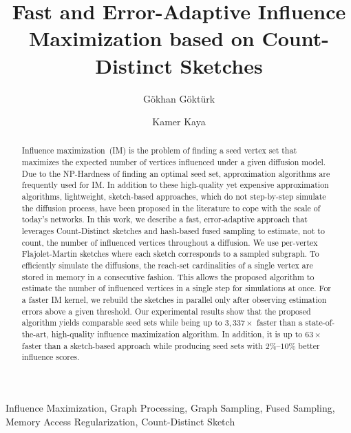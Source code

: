 \documentclass[final,5p,times,twocolumn]{elsarticle}
\newcommand\fixme[1]{#1}
\begin{document}
\begin{frontmatter}
\title{Fast and Error-Adaptive Influence Maximization based on Count-Distinct Sketches}%

\author[add]{Gökhan Göktürk}

\author[add]{Kamer Kaya}

\address[add]{Faculty of Engineering and Natural Sciences, Sabancı University, Turkey}



\begin{abstract}
Influence maximization~(IM) is the problem of finding a seed vertex set that maximizes the expected number of vertices influenced under a given diffusion model. Due to the NP-Hardness of finding an optimal seed set, approximation algorithms are frequently used for IM. 
In addition to these high-quality yet expensive approximation algorithms, lightweight, sketch-based approaches, which do not step-by-step simulate the diffusion process, have been proposed in the literature to cope with the scale of today's networks. 
In this work, we describe a fast, error-adaptive approach that leverages Count-Distinct sketches and hash-based fused sampling to estimate, not to count, the number of influenced vertices throughout a diffusion. We use per-vertex Flajolet-Martin sketches where each sketch corresponds to a sampled subgraph. To efficiently simulate the diffusions, the reach-set cardinalities of a single vertex are stored in memory in a consecutive fashion. This allows the proposed algorithm to estimate the number of influenced vertices in a single step for simulations at once. %
For a faster IM kernel, we rebuild the sketches in parallel only after observing estimation errors above a given threshold. Our experimental results show that the proposed algorithm yields comparable seed sets while being up to $3,337\times$ faster than a state-of-the-art, high-quality influence maximization algorithm. In addition, it is up to $63\times$ faster than a sketch-based approach while producing seed sets with $2\%$--$10\%$ better influence scores.
\end{abstract}
\begin{keyword}
Influence Maximization, Graph Processing, Graph Sampling, Fused Sampling, Memory Access Regularization, Count-Distinct Sketch
\end{keyword}
\end{frontmatter}
\end{document}
